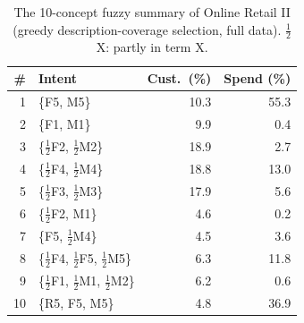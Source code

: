 \begin{table}[t]
\centering\footnotesize
\caption{The 10-concept fuzzy summary of Online Retail II (greedy description-coverage selection, full data). $\tfrac12$X: partly in term X.}
\label{tab:summaryview}
\begin{tabular}{rlrr}
\toprule
\# & Intent & Cust.\ (\%) & Spend (\%) \\
\midrule
1 & \{F5, M5\} & 10.3 & 55.3 \\
2 & \{F1, M1\} & 9.9 & 0.4 \\
3 & \{$\tfrac12$F2, $\tfrac12$M2\} & 18.9 & 2.7 \\
4 & \{$\tfrac12$F4, $\tfrac12$M4\} & 18.8 & 13.0 \\
5 & \{$\tfrac12$F3, $\tfrac12$M3\} & 17.9 & 5.6 \\
6 & \{$\tfrac12$F2, M1\} & 4.6 & 0.2 \\
7 & \{F5, $\tfrac12$M4\} & 4.5 & 3.6 \\
8 & \{$\tfrac12$F4, $\tfrac12$F5, $\tfrac12$M5\} & 6.3 & 11.8 \\
9 & \{$\tfrac12$F1, $\tfrac12$M1, $\tfrac12$M2\} & 6.2 & 0.6 \\
10 & \{R5, F5, M5\} & 4.8 & 36.9 \\
\bottomrule
\end{tabular}
\end{table}
